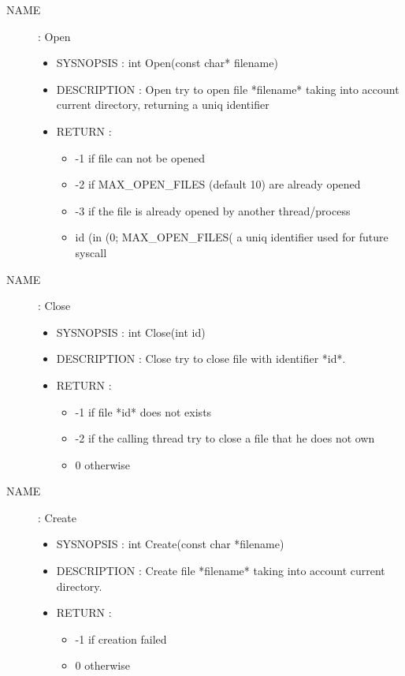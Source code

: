 \documentclass[a4paper,10pt]{article}
\begin{document}
\begin{description}
    \item [NAME] : Open
        \begin{itemize}
            \item SYSNOPSIS : int Open(const char* filename)
            \item DESCRIPTION :
                Open try to open file *filename* taking into account current directory,
                returning a uniq identifier
            \item RETURN :
                \begin{itemize}
                    \item -1 if file can not be opened
                    \item -2 if MAX\_OPEN\_FILES (default 10) are already opened
                    \item -3 if the file is already opened by another thread/process
                    \item id (in (0; MAX\_OPEN\_FILES( a uniq identifier used for future syscall %
                \end{itemize}
        \end{itemize}

    \item [NAME] : Close
        \begin{itemize}
            \item SYSNOPSIS : int Close(int id)
            \item DESCRIPTION :
                Close try to close file with identifier *id*.
            \item RETURN :
                \begin{itemize}
                    \item -1 if file *id* does not exists
                    \item -2 if the calling thread try to close a file that he does not own
                    \item 0 otherwise
                \end{itemize}
        \end{itemize}

    \item [NAME] : Create
        \begin{itemize}
            \item SYSNOPSIS : int Create(const char *filename)
            \item DESCRIPTION :
                Create file *filename* taking into account current directory.
            \item RETURN :
                \begin{itemize}
                    \item -1 if creation failed
                    \item 0 otherwise
                \end{itemize}
        \end{itemize}


\end{description}
\end{document}
